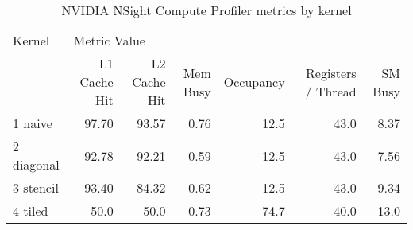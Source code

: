 \begin{table}
\centering
\caption{NVIDIA NSight Compute Profiler metrics by kernel}
\label{prof_table}
\begin{tabular}{lrrrrrr}
\toprule
    Kernel & \multicolumn{6}{l}{Metric Value} \\
           & L1 Cache Hit & L2 Cache Hit & Mem Busy & Occupancy & Registers / Thread & SM Busy \\
\midrule
   1 naive &        97.70 &        93.57 &     0.76 &      12.5 &               43.0 &    8.37 \\
2 diagonal &        92.78 &        92.21 &     0.59 &      12.5 &               43.0 &    7.56 \\
 3 stencil &        93.40 &        84.32 &     0.62 &      12.5 &               43.0 &    9.34 \\
 4 tiled   &        50.0  &        50.0 &      0.73 &      74.7 &               40.0 &    13.0 \\
\bottomrule
\end{tabular}
\end{table}
